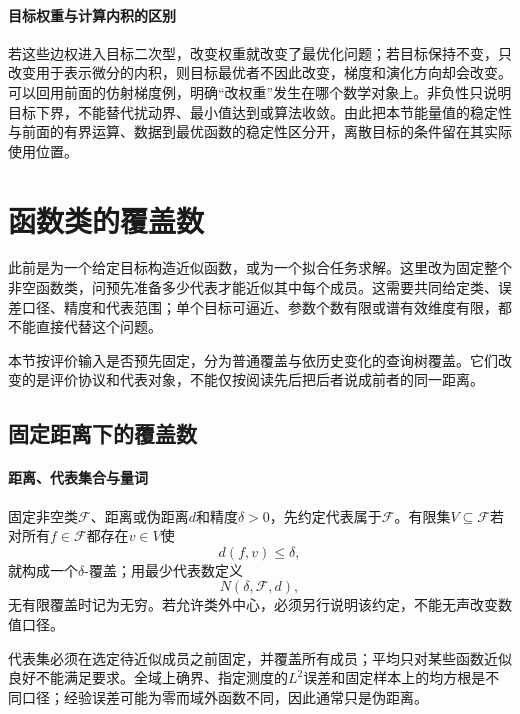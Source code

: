 \paragraph{目标权重与计算内积的区别}

若这些边权进入目标二次型，改变权重就改变了最优化问题；若目标保持不变，只改变用于表示微分的内积，则目标最优者不因此改变，梯度和演化方向却会改变。可以回用前面的仿射梯度例，明确“改权重”发生在哪个数学对象上。非负性只说明目标下界，不能替代扰动界、最小值达到或算法收敛。由此把本节能量值的稳定性与前面的有界运算、数据到最优函数的稳定性区分开，离散目标的条件留在其实际使用位置。

\section{函数类的覆盖数}
\label{sec:covering-numbers}

此前是为一个给定目标构造近似函数，或为一个拟合任务求解。这里改为固定整个非空函数类，问预先准备多少代表才能近似其中每个成员。这需要共同给定类、误差口径、精度和代表范围；单个目标可逼近、参数个数有限或谱有效维度有限，都不能直接代替这个问题。

本节按评价输入是否预先固定，分为普通覆盖与依历史变化的查询树覆盖。它们改变的是评价协议和代表对象，不能仅按阅读先后把后者说成前者的同一距离。

\subsection{固定距离下的覆盖数}
\label{subsubsec:covering-number-fixed}

\paragraph{距离、代表集合与量词}

\begin{definition}[固定距离下的覆盖数]
固定非空类$\mathcal F$、距离或伪距离$d$和精度$\delta>0$，先约定代表属于$\mathcal F$。有限集$V\subseteq\mathcal F$若对所有$f\in\mathcal F$都存在$v\in V$使
\[
  d(f,v)\le\delta,
\]
就构成一个$\delta$-覆盖；用最少代表数定义
\begin{equation}
  N(\delta,\mathcal F,d),
  \label{eq:functional-covering-number}
\end{equation}
无有限覆盖时记为无穷。若允许类外中心，必须另行说明该约定，不能无声改变数值口径。
\end{definition}

代表集必须在选定待近似成员之前固定，并覆盖所有成员；平均只对某些函数近似良好不能满足要求。全域上确界、指定测度的$L^2$误差和固定样本上的均方根是不同口径；经验误差可能为零而域外函数不同，因此通常只是伪距离。

